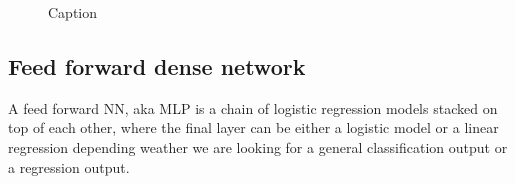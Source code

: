 \begin{figure}
    \centering
    \caption{Caption}
\end{figure}





\subsection{Feed forward dense network}
A feed forward NN, aka \ac{MLP} is a chain of logistic regression models stacked on top of each other, where the final layer can be either a logistic model or a linear regression depending weather we are looking for a general classification output or a regression output. 





